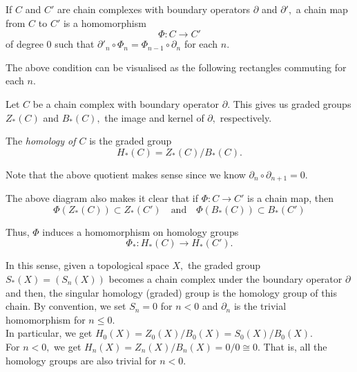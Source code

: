 \documentclass[12pt]{article}
\begin{document}
\begin{defn}
	If $C$ and $C'$ are chain complexes with boundary operators $\partial$ and $\partial',$ a chain map from $C$ to $C'$ is a homomorphism
	\begin{equation*} 
		\Phi:C\to C'
	\end{equation*}
	of degree $0$ such that $\partial'_n\circ\Phi_n = \Phi_{n-1}\circ\partial_{n}$ for each $n.$
\end{defn}
The above condition can be visualised as the following rectangles commuting for each $n.$
\begin{center}
\end{center}

\begin{defn}
	Let $C$ be a chain complex with boundary operator $\partial.$ This gives us graded groups $Z_*(C)$ and $B_*(C),$ the image and kernel of $\partial,$ respectively.

	The \emph{homology of $C$} is the graded group
	\begin{equation*} 
		H_*(C) = Z_*(C)/B_*(C).
	\end{equation*}
\end{defn}

Note that the above quotient makes sense since we know $\partial_n\circ\partial_{n+1} = 0.$


The above diagram also makes it clear that if $\Phi:C\to C'$ is a chain map, then
\begin{equation*} 
	\Phi(Z_*(C)) \subset Z_*(C') \quad \text{and} \quad \Phi(B_*(C)) \subset B_*(C')
\end{equation*}

Thus, $\Phi$ induces a homomorphism on homology groups
\begin{equation*} 
	\Phi_*:H_*(C) \to H_*(C').	
\end{equation*}

In this sense, given a topological space $X,$ the graded group $S_*(X) = (S_n(X))$ becomes a chain complex under the boundary operator $\partial$ and then, the singular homology (graded) group is the homology group of this chain. By convention, we set $S_n = 0$ for $n < 0$ and $\partial_n$ is the trivial homomorphism for $n \le 0.$ \\
In particular, we get $H_0(X) = Z_0(X)/B_0(X) = S_0(X)/B_0(X).$\\
For $n < 0,$ we get $H_n(X) = Z_n(X)/B_n(X) = 0/0 \cong 0.$ That is, all the homology groups are also trivial for $n < 0.$
\end{document}
